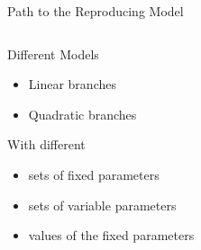 \begin{frame}{Path to the Reproducing Model}
    \begin{columns}
        \begin{column}{.5 \textwidth}
            Different Models
            \begin{itemize}
                \item Linear branches
                \item Quadratic branches
            \end{itemize}

            \vspace{2em}
            With different
            \begin{itemize}
                \item sets of fixed parameters
                \item sets of variable parameters
                \item values of the fixed parameters
            \end{itemize}
        \end{column}
        \begin{column}{.5 \textwidth}
            \vspace{-4em}
            \begin{figure}
                \centering
                \qquad
                \\
                \qquad
            \end{figure}
        \end{column}
    \end{columns}
\end{frame}

